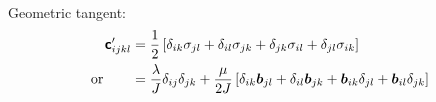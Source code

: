 \documentclass[10pt,letterpaper,oneside]{report}
\newcommand{\ten}[1]{\mbox{\boldmath $#1$}{}}
\newcommand{\tenf}[1]{\mbox{{\sffamily{\bfseries {#1}}}}}
\newcommand{\scas}[1]{\mbox{{\scriptsize{${\rm{#1}}$}}}{}}
\begin{document}
\begin{itemize}
\begin{align}
\end{align}

Geometric tangent:
\begin{align}
\tenf{c}'_{ijkl} ={}& \frac{1}{2} \left[ \delta_{ik}\sigma_{jl} + \delta_{il}\sigma_{jk} + \delta_{jk}\sigma_{il} + \delta_{jl}\sigma_{ik} \right]  
\\ \mbox{or} \qquad
={}& \frac{\lambda}{J} \delta_{ij} \delta_{jk} + \frac{\mu}{2J} \left[ \delta_{ik} \ten{b}_{jl} + \delta_{il} \ten{b}_{jk} + \ten{b}_{ik} \delta_{jl} + \ten{b}_{il} \delta_{jk} \right]
\end{align}


\newpage

\end{itemize}
\end{document}
